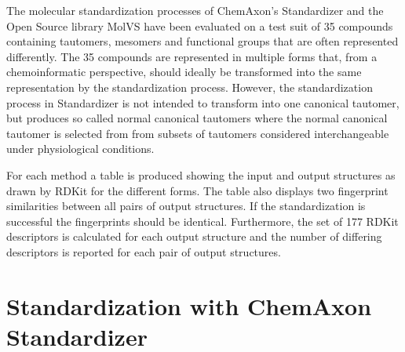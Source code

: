 \documentclass[
10pt, %
a4paper, %
oneside, %
]{article}
\title{\normalfont{Molecular standardization}}
\begin{document}
\maketitle

The molecular standardization processes of ChemAxon's Standardizer and the Open Source library MolVS have been evaluated 
on a test suit of 35 compounds containing tautomers, mesomers and functional groups that are often represented differently. 
The 35 compounds are represented in multiple forms that, from a chemoinformatic perspective, should ideally be transformed 
into the same representation by the standardization process. 
However, the standardization process in Standardizer is not intended to transform into one canonical tautomer, but 
produces so called normal canonical tautomers where the normal canonical tautomer is selected from from subsets of 
tautomers considered interchangeable under physiological conditions. 

For each method a table is produced showing the input and output structures as drawn by RDKit for the different forms.
The table also displays two fingerprint similarities between all pairs of output structures. If the standardization 
is successful the fingerprints should be identical. Furthermore, the set of 177 RDKit descriptors is calculated 
for each output structure and the number of differing descriptors is reported for each pair of output structures.





\section{Standardization with ChemAxon Standardizer }
\end{document}
